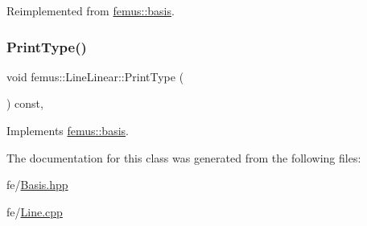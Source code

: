 Reimplemented from \mbox{\hyperlink{classfemus_1_1basis_a89b0797cdccffae5ff6d059b32016ae5}{femus\+::basis}}.

\mbox{\label{classfemus_1_1_line_linear_af205b1d34401f8c9aeebb4ee52bb2231}} 
\subsubsection{\texorpdfstring{Print\+Type()}{PrintType()}}
{\footnotesize\ttfamily void femus\+::\+Line\+Linear\+::\+Print\+Type (\begin{DoxyParamCaption}{ }\end{DoxyParamCaption}) const\hspace{0.3cm}{\ttfamily [inline]}, {\ttfamily [virtual]}}



Implements \mbox{\hyperlink{classfemus_1_1basis_abbae7bf8f31ec5793c911bc6d4ea0572}{femus\+::basis}}.



The documentation for this class was generated from the following files\+:\begin{DoxyCompactItemize}
\item 
fe/\mbox{\hyperlink{_basis_8hpp}{Basis.\+hpp}}\item 
fe/\mbox{\hyperlink{fe_2_line_8cpp}{Line.\+cpp}}\end{DoxyCompactItemize}

